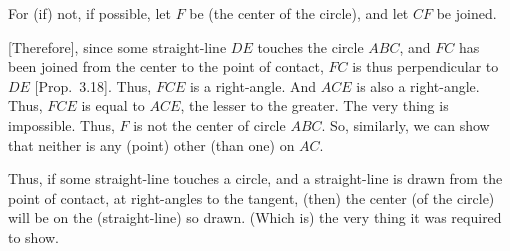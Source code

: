 \begin{Parallel}{}{}
{For (if) not, if possible, let $F$ be (the center of the circle), and let
$CF$ be joined.

\mbox{[}Therefore], since some straight-line $DE$ touches the circle $ABC$, and
$FC$ has been joined from the center to the point of contact, $FC$ is thus
perpendicular to $DE$ [Prop.~3.18]. Thus, $FCE$ is a right-angle.
And $ACE$ is also a right-angle. Thus, $FCE$ is equal to $ACE$, the lesser to the
greater. The very thing is impossible. Thus, $F$ is not the center of circle $ABC$. 
So, similarly, we can show that neither is any (point) other (than one) on $AC$.

Thus, if some straight-line touches a circle, and a straight-line is drawn from the
point of contact, at
right-angles to the tangent, (then) the center (of the circle) will be on the (straight-line) so drawn. (Which is) the very thing it was required to show.}
\end{Parallel}

